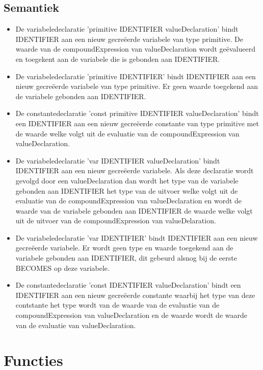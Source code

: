     \subsection{Semantiek}
        \begin{itemize}
        \item De variabeledeclaratie 'primitive IDENTIFIER valueDeclaration' bindt IDENTIFIER aan een nieuw gecre\"{e}erde variabele van type primitive. De waarde van de compoundExpression van valueDeclaration wordt ge\"{e}valueerd en toegekent aan de variabele die is gebonden aan IDENTIFIER. 
        \item De variabeledeclaratie 'primitive IDENTIFIER' bindt IDENTIFIER aan een nieuw gecre\"{e}erde variabele van type primitive. Er geen waarde toegekend aan de variabele gebonden aan IDENTIFIER.
        \item De constantedeclaratie 'const primitive IDENTIFIER valueDeclaration' bindt een IDENTIFIER aan een nieuw gecre\"{e}erde constante van type primitive met de waarde welke volgt uit de evaluatie van de compoundExpression van valueDeclaration.
        \item De variabeledeclaratie 'var IDENTIFIER valueDeclaration' bindt IDENTIFIER aan een nieuw gecre\"{e}erde variabele. Als deze declaratie wordt gevolgd door een valueDeclaration dan wordt het type van de variabele gebonden aan IDENTIFIER het type van de uitvoer welke volgt uit de evaluatie van de compoundExpression van valueDeclaration en wordt de waarde van de variabele gebonden aan IDENTIFIER de waarde welke volgt uit de uitvoer van de compoundExpression van valueDelaration.
        \item De variabeledeclaratie 'var IDENTIFIER' bindt IDENTIFIER aan een nieuw gecre\"{e}erde variabele. Er wordt geen type en waarde toegekend aan de variabele gebonden aan IDENTIFIER, dit gebeurd alsnog bij de eerste BECOMES op deze variabele.
        \item De constantedeclaratie 'const IDENTIFIER valueDeclaration' bindt een IDENTIFIER aan een nieuw gecre\"{e}erde constante waarbij het type van deze contstante het type wordt van de waarde van de evaluatie van de compoundExpression van valueDeclaration en de waarde wordt de waarde van de evaluatie van valueDeclaration. 
        \end{itemize}

\section{Functies}
